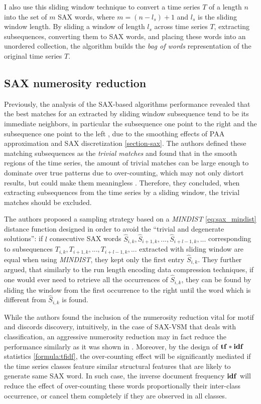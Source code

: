 I also use this sliding window technique to convert a time series $T$ of a length $n$ into 
the set of $m$ SAX words, where $m=(n-l_{s})+1$ and $l_{s}$ is the sliding window length. 
By sliding a window of length $l_{s}$ across time series $T$, extracting subsequences, 
converting them to SAX words, and placing these words into an unordered collection, 
the algorithm builds the \textit{bag of words} representation of the original time series $T$.

\subsection{SAX numerosity reduction}\label{section_numerosity_reduction}
Previously, the analysis of the SAX-based algorithms performance revealed that the best matches for an extracted 
by sliding window subsequence tend to be its immediate neighbors, in particular the subsequence one point to the 
right and the subsequence one point to the left \cite{citeulike:3977965} \cite{citeulike:3175749}, 
due to the smoothing effects of PAA approximation and SAX discretization \ref{section-sax}. 
The authors defined these matching subsequences as the \textit{trivial matches} and found that in the smooth 
regions of the time series, the amount of trivial matches can be large enough to dominate over true patterns due to 
over-counting, which may not only distort results, but could make them meaningless \cite{citeulike:227029}. 
Therefore, they concluded, when extracting subsequences from the time series by a sliding window, the trivial 
matches should be excluded. 

The authors proposed a sampling strategy based on a \textit{MINDIST} \ref{eq:sax_mindist} distance 
function designed in order to avoid the ``trivial and degenerate solutions'': if $l$ consecutive SAX words \newline 
$\widehat{S}_{i,k}, \widehat{S}_{i+1,k},...,\widehat{S}_{i+l-1,k},...$
corresponding to subsequences $T_{i,k}, T_{i+1,k},...,T_{i+l-1,k},...$ extracted with sliding window are 
equal when using \textit{MINDIST}, they kept only the first entry $\widehat{S}_{i,k}$. 
They further argued, that similarly to the run length encoding data compression techniques, if one would 
ever need to retrieve all the occurrences of $\widehat{S}_{i,k}$, they can be found by sliding the window from 
the first occurrence to the right until the word which is different from $\widehat{S}_{i,k}$ is found. 

While the authors found the inclusion of the numerosity reduction vital for motif and discords discovery, 
intuitively, in the case of SAX-VSM that deals with classification, an aggressive numerosity reduction may 
in fact reduce the performance similarly as it was shown in \cite{citeulike:10525778}. 
Moreover, by the design of $\text{\textbf{tf}}\ast\text{\textbf{idf}}$ statistics \eqref{formula:tfidf},
the over-counting effect will be significantly mediated if the time series classes feature similar structural 
features that are likely to generate same SAX word. 
In such case, the inverse document frequency $\text{\textbf{idf}}$ will reduce the effect of over-counting 
these words proportionally their inter-class occurrence, or cancel them completely if they are observed in all classes.

